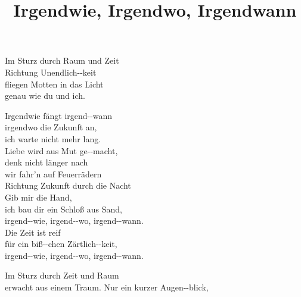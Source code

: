 \title{Irgendwie, Irgendwo, Irgendwann} 

\begin{enumerate}
\verse {} Im Sturz durch Raum und  Zeit \\ 
Richtung Unendlich--keit \\ 
 fliegen Motten in das  Licht \\ 
genau wie du und  ich. 

 {} Irgendwie fängt irgend--wann \\ 
irgendwo die Zukunft  an, \\ 
ich warte nicht mehr  lang. \\ 
 Liebe wird aus Mut ge--macht, \\ 
denk nicht länger nach \\ 
wir  fahr’n auf Feuerrädern \\ 
Richtung  Zukunft durch die Nacht \\ 
 Gib mir die  Hand, \\ 
ich bau  dir ein Schloß aus  Sand, \\ 
irgend--wie, irgend--wo, irgend--wann. \\ 
 Die Zeit ist  reif \\ 
für ein biß--chen Zärtlich--keit, \\ 
irgend--wie, irgend--wo, irgend--wann.

\verse {} Im Sturz durch Zeit und  Raum \\ 
erwacht aus einem  Traum. 
 Nur ein kurzer Augen--blick,

\end{enumerate}